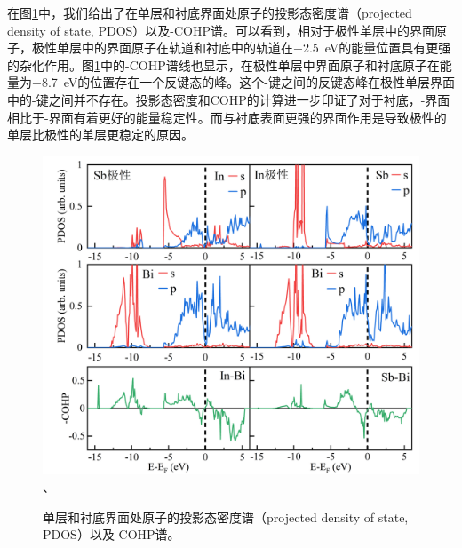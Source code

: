 在图\ref{fig:IS_DFT_PDOS}中，我们给出了在单层和衬底界面处原子的投影态密度谱（projected density of state, PDOS）以及-COHP谱。可以看到，相对于极性单层中的界面原子，极性单层中的界面原子在轨道和衬底中的轨道在\SI{-2.5}{\electronvolt}的能量位置具有更强的杂化作用。图\ref{fig:IS_DFT_PDOS}中的-COHP谱线也显示，在极性单层中界面原子和衬底原子在能量为\SI{-8.7}{\electronvolt}的位置存在一个反键态的峰。这个-键之间的反键态峰在极性单层界面中的-键之间并不存在。投影态密度和COHP的计算进一步印证了对于衬底，-界面相比于-界面有着更好的能量稳定性。而与衬底表面更强的界面作用是导致极性的单层比极性的单层更稳定的原因。

\begin{figure}[htb]
    \includegraphics{pic/IS_DFT_PDOS-COHP.png}、
    \caption{单层和衬底界面处原子的投影态密度谱（projected density of state, PDOS）以及-COHP谱。 }
    \label{fig:IS_DFT_PDOS}
\end{figure}

